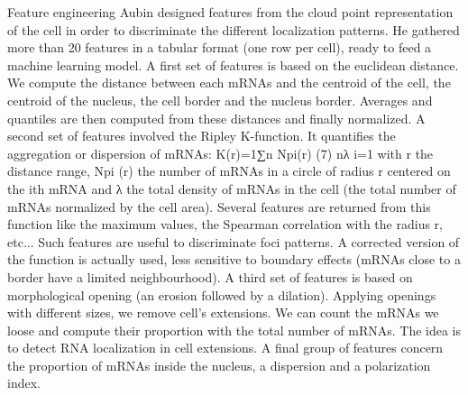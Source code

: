 Feature engineering Aubin designed features from the cloud point representation
of the cell in order to discriminate the different localization patterns. He
gathered more than 20 features in a tabular format
(one row per cell), ready to feed a machine learning model.
A first set of features is based on the euclidean distance. We compute the distance between each
mRNAs and the centroid of the cell, the centroid of the nucleus, the cell border and
the nucleus border. Averages and quantiles are then computed from these distances and finally normalized.
A second set of features involved the Ripley K-function. It quantifies the aggregation or dispersion of mRNAs:
K(r)=1∑n Npi(r) (7) nλ
i=1
with r the distance range, Npi (r) the number of mRNAs in a circle of radius r centered
on the ith mRNA and λ the total density of mRNAs in the cell (the total number of mRNAs
normalized by the cell area). Several features are returned from this function like the
maximum values, the Spearman correlation with the radius r, etc... Such features are
useful to discriminate foci patterns. A corrected version of the function is actually
used, less sensitive to boundary effects (mRNAs close to a border have a limited neighbourhood).
A third set of features is based on morphological opening (an erosion followed by a dilation).
Applying openings with different sizes, we remove cell’s extensions. We can count the mRNAs
we loose and compute their proportion with the total number of mRNAs. The idea is to detect
RNA localization in cell extensions.
A final group of features concern the proportion of mRNAs inside the nucleus, a dispersion
and a polarization index.





